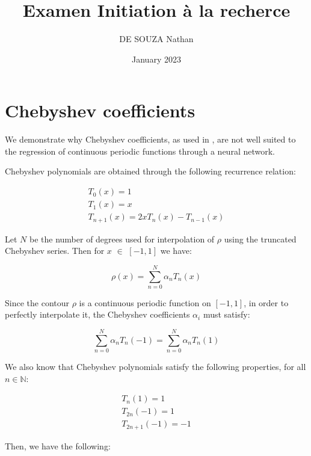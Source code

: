 \documentclass[10pt,twocolumn]{article}
\title{Examen Initiation à la recherce}
\author{DE SOUZA Nathan}
\date{January 2023}
\begin{document}
\section{Chebyshev coefficients}


    We demonstrate why Chebyshev coefficients, as used
in \cite{xu2019explicit}, are not well suited to the regression of continuous
periodic functions through a neural network.

Chebyshev polynomials are obtained through the following
recurrence relation:

\begin{equation}
    \begin{array}{c}
          T_0 \left(x\right) = 1 \\ 
          T_1 \left(x\right) = x \\
          T_{n+1} \left(x\right) = 2 x T_n \left(x\right) - T_{n-1} \left(x\right)
    \end{array}
\end{equation}

Let $N$ be the number of degrees used for interpolation of $\rho$ using the truncated Chebyshev series. Then for $x$ $\in$ $\left[ -1, 1 \right] $ we have:

\begin{equation}
    \rho \left(x\right) = \sum_{n=0}^{N} \alpha_n T_n \left(x\right)
\end{equation}

Since the contour $\rho$ is a continuous periodic function on
$\left[ -1, 1 \right] $, in order to perfectly interpolate it, the Chebyshev
coefficients $\alpha_i$ must satisfy:

\begin{equation}
    \sum_{n=0}^{N} \alpha_n T_n \left(-1\right) = \sum_{n=0}^{N} \alpha_n T_n \left(1\right)
\end{equation}

We also know that Chebyshev polynomials satisfy the
following properties, for all $n \in \mathbb{N} $:

\begin{equation}
    \begin{array}{c}
          T_n \left(1\right) = 1 \\ 
          T_{2n} \left(-1\right) = 1 \\
          T_{2n+1} \left(-1\right) = -1
    \end{array}
\end{equation}

Then, we have the following:
\end{document}

